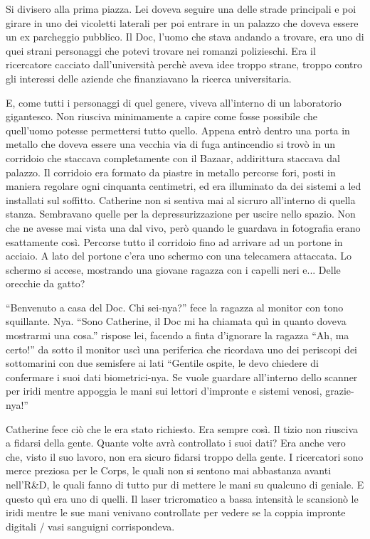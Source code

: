     Si divisero alla prima piazza. Lei doveva seguire una delle strade principali e poi girare in uno dei vicoletti
    laterali per poi entrare in un palazzo che doveva essere un ex parcheggio pubblico. Il Doc, l'uomo che stava andando
    a trovare, era uno di quei strani personaggi che potevi trovare nei romanzi polizieschi. Era il ricercatore cacciato
    dall'università perchè aveva idee troppo strane, troppo contro gli interessi delle aziende che finanziavano la
    ricerca universitaria.
    
    E, come tutti i personaggi di quel genere, viveva all'interno di un laboratorio gigantesco. Non riusciva minimamente
    a capire come fosse possibile che quell'uomo potesse permettersi tutto quello. Appena entrò dentro una porta in
    metallo che doveva essere una vecchia via di fuga antincendio si trovò in un corridoio che staccava completamente
    con il Bazaar, addirittura staccava dal palazzo. Il corridoio era formato da piastre in metallo percorse fori, posti
    in maniera regolare ogni cinquanta centimetri, ed era illuminato da dei sistemi a led installati sul soffitto.
    Catherine non si sentiva mai al sicruro all'interno di quella stanza. Sembravano quelle per la depressurizzazione
    per uscire nello spazio. Non che ne avesse mai vista una dal vivo, però quando le guardava in fotografia erano
    esattamente così. Percorse tutto il corridoio fino ad arrivare ad un portone in acciaio. A lato del portone c'era
    uno schermo con una telecamera attaccata. Lo schermo si accese, mostrando una giovane ragazza con i capelli neri
    e... Delle orecchie da gatto?

    ``Benvenuto a casa del Doc. Chi sei-nya?'' fece la ragazza al monitor con tono squillante. Nya. ``Sono Catherine, il Doc mi ha chiamata
    quì in quanto doveva mostrarmi una cosa.'' rispose lei, facendo a finta d'ignorare la ragazza ``Ah, ma certo!'' da
    sotto il monitor uscì una periferica che ricordava uno dei periscopi dei sottomarini con due semisfere ai lati
    ``Gentile ospite, le devo chiedere di confermare i suoi dati biometrici-nya. Se vuole guardare all'interno dello
    scanner per iridi mentre appoggia le mani sui lettori d'impronte e sistemi venosi, grazie-nya!''

    Catherine fece ciò che le era stato richiesto. Era sempre così. Il tizio non riusciva a fidarsi della gente. Quante
    volte avrà controllato i suoi dati? Era anche vero che, visto il suo lavoro, non era sicuro fidarsi troppo della
    gente. I ricercatori sono merce preziosa per le Corps, le quali non si sentono mai abbastanza avanti nell'R\&D, le
    quali fanno di tutto pur di mettere le mani su qualcuno di geniale. E questo quì era uno di quelli. Il laser
    tricromatico a bassa intensità le scansionò le iridi mentre le sue mani venivano controllate per vedere se la coppia
    impronte digitali / vasi sanguigni corrispondeva.


